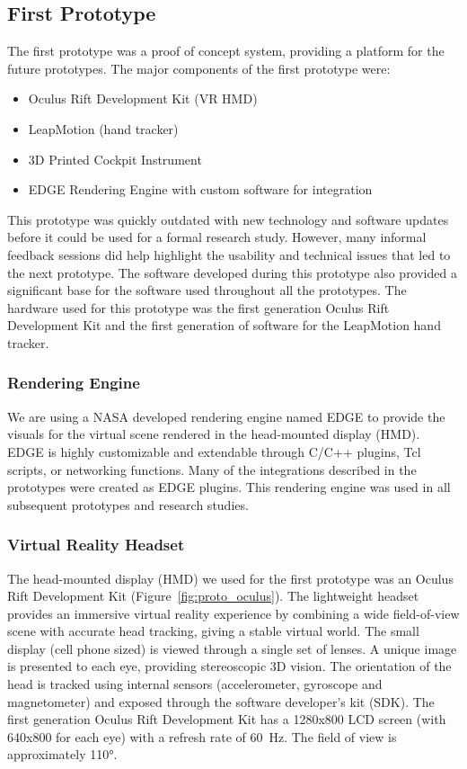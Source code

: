 \subsection{First Prototype}

The first prototype was a proof of concept system, providing a platform for the future prototypes.
The major components of the first prototype were:
\begin{itemize}
    \item Oculus Rift Development Kit (VR HMD)
    \item LeapMotion (hand tracker)
    \item 3D Printed Cockpit Instrument
    \item EDGE Rendering Engine with custom software for integration
\end{itemize}

This prototype was quickly outdated with new technology and software updates before it could be used for a formal research study.
However, many informal feedback sessions did help highlight the usability and technical issues that led to the next prototype.
The software developed during this prototype also provided a significant base for the software used throughout all the prototypes.
The hardware used for this prototype was the first generation Oculus Rift Development Kit and the first generation of software for the LeapMotion hand tracker.

\subsubsection{Rendering Engine}

We are using a NASA developed rendering engine named EDGE to provide the visuals for the virtual scene rendered in the head-mounted display (HMD).
EDGE is highly customizable and extendable through C/C++ plugins, Tcl scripts, or networking functions.
Many of the integrations described in the prototypes were created as EDGE plugins.
This rendering engine was used in all subsequent prototypes and research studies.

\subsubsection{Virtual Reality Headset}

The head-mounted display (HMD) we used for the first prototype was an Oculus Rift Development Kit (Figure~\ref{fig:proto_oculus}).
The lightweight headset provides an immersive virtual reality experience by combining a wide field-of-view scene with accurate head tracking, giving a stable virtual world.
The small display (cell phone sized) is viewed through a single set of lenses.
A unique image is presented to each eye, providing stereoscopic 3D vision.
The orientation of the head is tracked using internal sensors (accelerometer, gyroscope and magnetometer) and exposed through the software developer’s kit (SDK).
The first generation Oculus Rift Development Kit has a 1280x800 LCD screen (with 640x800 for each eye) with a refresh rate of \SI{60}{\hertz}.
The field of view is approximately \ang{110}.

